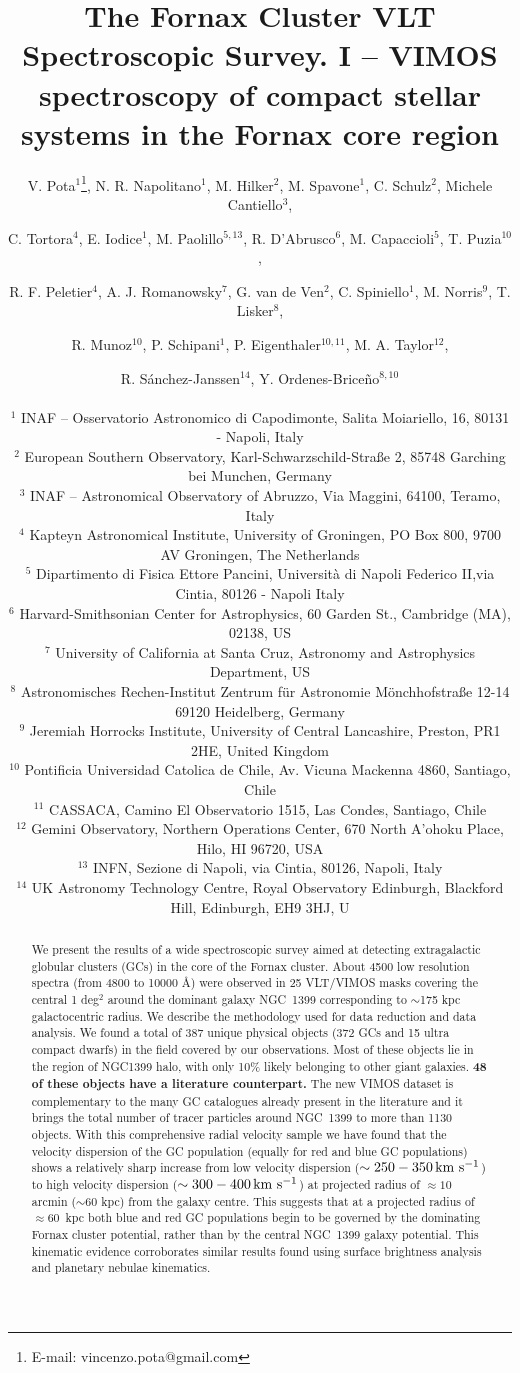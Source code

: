 \documentclass[usenatbib]{mnras}
\title[The Fornax Cluster VLT Spectroscopic Survey]{The Fornax Cluster VLT
Spectroscopic Survey. I -- VIMOS spectroscopy of compact stellar systems in the Fornax core region}
\author[Pota et al.]{\noindent
V. Pota$^{1}$\thanks{E-mail: vincenzo.pota@gmail.com},
N. R. Napolitano$^{1}$,
M. Hilker$^{2}$,
M. Spavone$^{1}$,
C. Schulz$^{2}$,
Michele Cantiello$^{3}$,
\and
C. Tortora$^{4}$,
E. Iodice$^{1}$,
M. Paolillo$^{5,13}$,
R. D'Abrusco$^{6}$,
M. Capaccioli$^{5}$,
T. Puzia$^{10}$ ,
\and
R. F. Peletier$^{4}$,
A. J. Romanowsky$^{7}$,
G. van de Ven$^{2}$,
C. Spiniello$^{1}$,
M. Norris$^{9}$,
T. Lisker$^{8}$,
\and
R. Munoz$^{10}$,
P. Schipani$^{1}$,
P. Eigenthaler$^{10,11}$,
M. A. Taylor$^{12}$,
\and
R. S\'anchez-Janssen$^{14}$,
Y. Ordenes-Brice\~no$^{8,10}$
\\~\\
$^1$ INAF -- Osservatorio Astronomico di Capodimonte, Salita Moiariello, 16, 80131 - Napoli, Italy\\
$^2$ European Southern Observatory, Karl-Schwarzschild-Stra{\ss}e 2, 85748 Garching bei Munchen, Germany\\
$^3$ INAF -- Astronomical Observatory of Abruzzo, Via Maggini, 64100, Teramo, Italy\\
$^4$ Kapteyn Astronomical Institute, University of Groningen, PO Box 800, 9700 AV Groningen, The Netherlands\\
$^5$ Dipartimento di Fisica Ettore Pancini, Universit\`a di Napoli Federico II,via Cintia, 80126 - Napoli Italy\\
$^6$ Harvard-Smithsonian Center for Astrophysics, 60 Garden St., Cambridge (MA), 02138, US\\
$^7$ University of California at Santa Cruz, Astronomy and Astrophysics Department, US\\
$^8$ Astronomisches Rechen-Institut Zentrum f{\"u}r Astronomie M{\"o}nchhofstra{\ss}e 12-14 69120 Heidelberg, Germany \\
$^9$ Jeremiah Horrocks Institute, University of Central Lancashire, Preston, PR1 2HE, United Kingdom\\
$^{10}$ Pontificia Universidad Catolica de Chile, Av. Vicuna Mackenna 4860, Santiago, Chile \\
$^{11}$ CASSACA, Camino El Observatorio 1515, Las Condes, Santiago, Chile\\
$^{12}$ Gemini Observatory, Northern Operations Center, 670 North A'ohoku Place, Hilo, HI 96720, USA\\
$^{13}$ INFN, Sezione di Napoli, via Cintia, 80126, Napoli, Italy\\
$^{14}$ UK Astronomy Technology Centre, Royal Observatory Edinburgh, Blackford Hill, Edinburgh, EH9 3HJ, U
}
\newcommand{\kms}{\mbox{\,km~s$^{-1}$}}
\begin{document}
\label{firstpage}

\maketitle
\begin{abstract}
We present the results of a wide spectroscopic survey aimed at detecting
extragalactic globular clusters (GCs) in the core of the Fornax cluster.
About 4500 low resolution spectra (from 4800
to 10000 \AA) were observed in 25 VLT/VIMOS masks covering the central 1 deg$^2$
around the dominant galaxy NGC~1399 corresponding to $\sim$175 kpc galactocentric radius.
We describe the methodology used for data reduction and data analysis. We found a total of
387 unique physical objects (372 GCs and 15 ultra compact dwarfs) in the field
covered by our observations. 
Most of these objects lie in the region of NGC1399 halo, with only
10\% likely belonging to other giant galaxies. \textbf{48 of these objects have a literature counterpart.}
The new VIMOS dataset is complementary to the many
GC catalogues already present in the literature and it brings the total number
of tracer particles around  NGC~1399 to more than 1130 objects.
With this comprehensive radial velocity sample we have found that the velocity
dispersion of the GC population (equally for red and blue GC populations) shows
a relatively sharp increase from low velocity dispersion ($\sim 250-350 \kms$)
to high velocity dispersion ($\sim 300-400 \kms$) at projected radius of $\approx10$ arcmin
($\sim 60$ kpc) from the galaxy centre.
This suggests that at a projected radius of $\approx60$~kpc both blue and red GC populations
begin to be governed by the dominating Fornax cluster potential, rather than by the central
NGC~1399 galaxy potential. This kinematic evidence corroborates similar results found using
surface brightness analysis and planetary nebulae kinematics.
\end{abstract}
\end{document}
